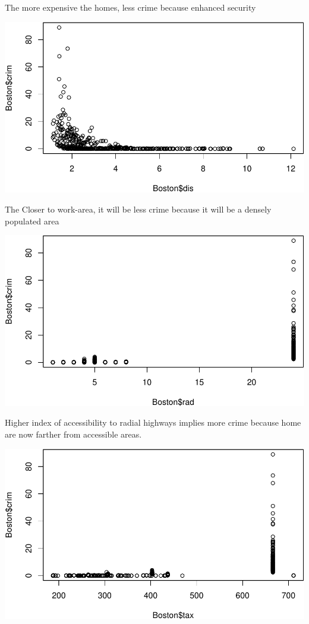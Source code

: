 \documentclass[
]{article}
\begin{document}
The more expensive the homes, less crime because enhanced security

\begin{center}\includegraphics{Disha_Gandhi_Take_Home_Exam_PDF_files/figure-latex/unnamed-chunk-4-1} \end{center}

The Closer to work-area, it will be less crime because it will be a
densely populated area

\begin{center}\includegraphics{Disha_Gandhi_Take_Home_Exam_PDF_files/figure-latex/unnamed-chunk-5-1} \end{center}

Higher index of accessibility to radial highways implies more crime
because home are now farther from accessible areas.

\begin{center}\includegraphics{Disha_Gandhi_Take_Home_Exam_PDF_files/figure-latex/unnamed-chunk-6-1} \end{center}
\end{document}
